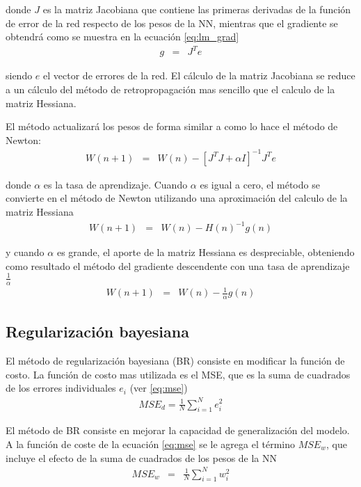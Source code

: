  donde $J$ es la matriz Jacobiana que contiene las primeras derivadas de la función de error de la red respecto de los pesos de la NN, mientras que el gradiente se obtendrá como se muestra en la ecuación \ref{eq:lm_grad}
 \begin{eqnarray}
	 g &=& J^{T}e\label{eq:lm_grad}
 \end{eqnarray}

siendo $e$ el vector de errores de la red. El cálculo de la matriz Jacobiana se reduce a un cálculo del método de retropropagación \cite{Hagan1994} mas sencillo que el calculo de la matriz Hessiana.

El método actualizará los pesos de forma similar a como lo hace el método de Newton:
\begin{eqnarray}
	W(n + 1) &=& W(n) - [J^{T}J + \alpha I]^{-1}J^{T}e
\end{eqnarray}

donde $\alpha$ es la tasa de aprendizaje. Cuando $\alpha$ es igual a cero, el método se convierte en el método de Newton utilizando una aproximación del calculo de la matriz Hessiana
\begin{eqnarray}
	W(n + 1) &=& W(n) - H(n)^{-1}g(n)
\end{eqnarray}

y cuando $\alpha$ es grande, el aporte de la matriz Hessiana es despreciable, obteniendo como resultado el método del gradiente descendente con una tasa de aprendizaje $\frac{1}{\alpha}$
\begin{eqnarray}
	W(n + 1) &=& W(n) - \frac{1}{\alpha}g(n)
\end{eqnarray}

\subsection{Regularización bayesiana}
El método de regularización bayesiana (BR) consiste en modificar la función de costo. La función de costo mas utilizada es el MSE, que es la suma de cuadrados de los errores individuales $e_{i}$ (ver \ref{eq:mse})
\begin{eqnarray}
	MSE_{d} = \frac{1}{N}\sum_{i = 1}^{N}e_{i}^{2}\label{eq:mse}
\end{eqnarray}

El método de BR consiste en mejorar la capacidad de generalización del modelo. A la función de coste de la ecuación \ref{eq:mse} se le agrega el término $MSE_{w}$, que incluye el efecto de la suma de cuadrados de los pesos de la NN
\begin{eqnarray}
	MSE_{w} &=& \frac{1}{N}\sum_{i = 1}^{N}w_{i}^{2}
\end{eqnarray}

